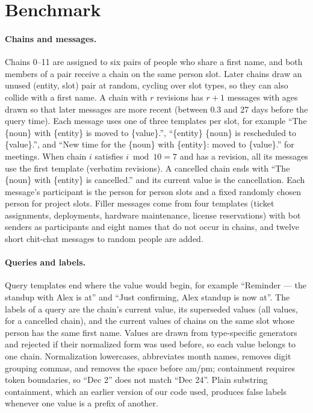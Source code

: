 \documentclass{article} %
\begin{document}
\section{Benchmark}
\label{app:bench}

\paragraph{Chains and messages.} Chains 0--11 are assigned to six pairs of people who share a first name, and both members of a pair receive a chain on the same person slot. Later chains draw an unused (entity, slot) pair at random, cycling over slot types, so they can also collide with a first name. A chain with $r$ revisions has $r+1$ messages with ages drawn so that later messages are more recent (between 0.3 and 27 days before the query time). Each message uses one of three templates per slot, for example ``The \{noun\} with \{entity\} is moved to \{value\}.'', ``\{entity\} \{noun\} is rescheduled to \{value\}.'', and ``New time for the \{noun\} with \{entity\}: moved to \{value\}.'' for meetings. When chain $i$ satisfies $i \bmod 10=7$ and has a revision, all its messages use the first template (verbatim revisions). A cancelled chain ends with ``The \{noun\} with \{entity\} is cancelled.'' and its current value is the cancellation. Each message's participant is the person for person slots and a fixed randomly chosen person for project slots. Filler messages come from four templates (ticket assignments, deployments, hardware maintenance, license reservations) with bot senders as participants and eight names that do not occur in chains, and twelve short chit-chat messages to random people are added.

\paragraph{Queries and labels.} Query templates end where the value would begin, for example ``Reminder --- the standup with Alex is at'' and ``Just confirming, Alex standup is now at''. The labels of a query are the chain's current value, its superseded values (all values, for a cancelled chain), and the current values of chains on the same slot whose person has the same first name. Values are drawn from type-specific generators and rejected if their normalized form was used before, so each value belongs to one chain. Normalization lowercases, abbreviates month names, removes digit grouping commas, and removes the space before am/pm; containment requires token boundaries, so ``Dec 2'' does not match ``Dec 24''. Plain substring containment, which an earlier version of our code used, produces false labels whenever one value is a prefix of another.
\end{document}
